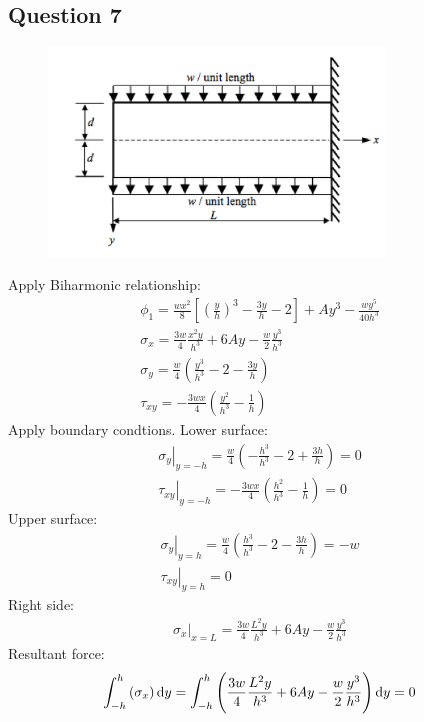 \documentclass[11pt]{article}
\numberwithin{equation}{section}
\begin{document}
\subsection{Question 7}
\begin{figure}[H]
    \centering
    \includegraphics[width = 0.8\textwidth]{./img/diagram1.png}
    \caption{}
\end{figure}
Apply Biharmonic relationship:
\begin{gather}
    \phi_1 = \frac{wx^2}{8} \left[\left(\frac{y}{h}\right)^3-\frac{3y}{h} -2 \right] + Ay^3 - \frac{wy^5}{40h^3}\\
    \sigma_x = \frac{3w}{4}\frac{x^2y}{h^3} + 6Ay - \frac{w}{2}\frac{y^3}{h^3}\\
    \sigma_y = \frac{w}{4}\left(\frac{y^3}{h^3}-2-\frac{3y}{h}\right)\\
    \tau_{xy} = -\frac{3wx}{4}\left(\frac{y^2}{h^3} - \frac{1}{h}\right)
\end{gather}
Apply boundary condtions. Lower surface:
\begin{gather}
    \left. \sigma_y \right|_{y=-h} = \frac{w}{4}\left(-\frac{h^3}{h^3}-2 + \frac{3h}{h}\right) = 0\\
    \left. \tau_{xy}\right|_{y=-h} = -\frac{3wx}{4}\left(\frac{h^2}{h^3}-\frac{1}{h}\right) = 0
\end{gather}
Upper surface:
\begin{gather}
    \left. \sigma_y \right|_{y=h} = \frac{w}{4}\left(\frac{h^3}{h^3} - 2 - \frac{3h}{h}\right) = -w\\
    \left. \tau_{xy}\right|_{y=h} = 0
\end{gather}
Right side:
\begin{gather}
    \left. \sigma_x \right|_{x = L} = \frac{3w}{4}\frac{L^2y}{h^3} + 6Ay -\frac{w}{2}\frac{y^3}{h^3}
\end{gather}
Resultant force:
\begin{gather}
    \int_{-h}^h \left(\sigma_x\right)\dif y = \int_{-h}^h \left(\frac{3w}{4}\frac{L^2y}{h^3} + 6Ay -\frac{w}{2}\frac{y^3}{h^3}\right)\dif y = 0
\end{gather}
\end{document}
